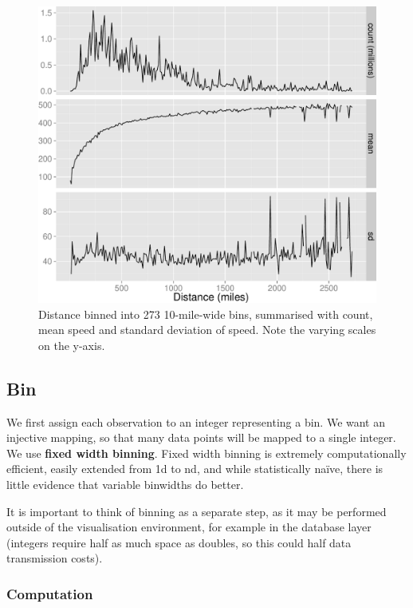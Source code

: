 \documentclass[journal]{vgtc}                %
\begin{document}
\begin{figure}[htb]
 \centering
 \includegraphics[width=\linewidth]{condense}
 \caption{Distance binned into 273 10-mile-wide bins, summarised with count, mean speed and standard deviation of speed. Note the varying scales on the y-axis.}
 \label{fig:condense}
\end{figure}

\subsection{Bin}
\label{sub:bin}

We first assign each observation to an integer representing a bin. We want an injective mapping, so that many data points will be mapped to a single integer.
We use {\bf fixed width binning}. Fixed width binning is extremely computationally efficient, easily extended from 1d to nd, and while statistically na\"ive, there is little evidence that variable binwidths do better. 

It is important to think of binning as a separate step, as it may be performed outside of the visualisation environment, for example in the database layer (integers require half as much space as doubles, so this could half data transmission costs). 

\subsubsection{Computation}
\end{document}
